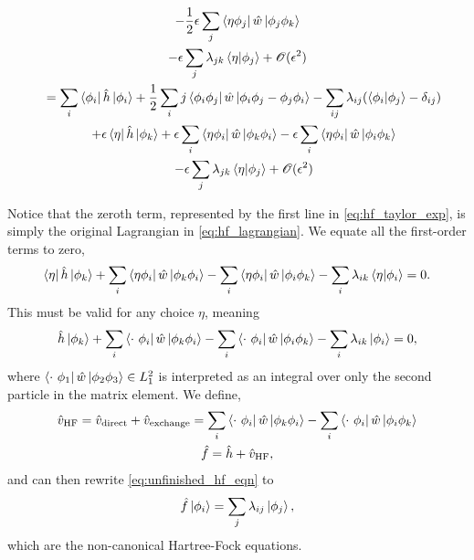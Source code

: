 \begin{gather}
\begin{gathered}
            - \frac{1}{2} \epsilon \sum_j \bra{\eta\phi_j} \hat{w}
                \ket{\phi_j \phi_k} \\
            - \epsilon \sum_j \lambda_{jk}\braket{\eta}{\phi_j}
            + \mathscr{O}(\epsilon^2) 
        \end{gathered} \\
        \quad
        \begin{gathered}
            \label{eq:hf_taylor_exp}
            =
            \sum_i \bra{\phi_i} \hat{h} \ket{\phi_i} 
            + \frac{1}{2} \sum_ij \bra{\phi_i \phi_j} \hat{w} 
                    \ket{\phi_i \phi_j - \phi_j \phi_i}
            - \sum_{ij}\lambda_{ij}(\braket{\phi_i}{\phi_j} - \delta_{ij}) \\
            + \epsilon\bra{\eta} \hat{h} \ket{\phi_k}
            + \epsilon \sum_i \bra{\eta\phi_i} \hat{w} \ket{\phi_k \phi_i}
            - \epsilon \sum_i \bra{\eta\phi_i} \hat{w} \ket{\phi_i \phi_k} \\
            - \epsilon \sum_j \lambda_{jk}\braket{\eta}{\phi_j}
            + \mathscr{O}(\epsilon^2) 
        \end{gathered}
    \end{gather}

Notice that the zeroth term, represented by the first line in \autoref{eq:hf_taylor_exp},
is simply the original Lagrangian in \autoref{eq:hf_lagrangian}. We equate all the 
first-order terms to zero,
\begin{equation}
    \bra{\eta} \hat{h} \ket{\phi_k} 
    + \sum_i \bra{\eta \phi_i} \hat{w} \ket{\phi_k\phi_i}
    - \sum_i \bra{\eta \phi_i} \hat{w} \ket{\phi_i\phi_k}
    - \sum_i \lambda_{ik} \braket{\eta}{\phi_i} = 0.
\end{equation}
This must be valid for any choice $\eta$, meaning
\begin{equation}
    \label{eq:unfinished_hf_eqn}
    \hat{h} \ket{\phi_k} 
    + \sum_i \bra{\cdot\ \phi_i} \hat{w} \ket{\phi_k\phi_i}
    - \sum_i \bra{\cdot\ \phi_i} \hat{w} \ket{\phi_i\phi_k}
    - \sum_i \lambda_{ik} \ket{\phi_i} = 0,
\end{equation}
where $\bra{\cdot\ \phi_1} \hat{w} \ket{\phi_2 \phi_3} \in L_1^2$ is interpreted
as an integral over only the second particle in the matrix element. We define,
\begin{gather}
    \hat{v}_{\text{HF}} = \hat{v}_{\text{direct}} + \hat{v}_{\text{exchange}}
        =\sum_i \bra{\cdot\ \phi_i} \hat{w} \ket{\phi_k\phi_i}
        -\sum_i \bra{\cdot\ \phi_i} \hat{w} \ket{\phi_i\phi_k} \\
    \hat{f} = \hat{h} + \hat{v}_{\text{HF}},
\end{gather}
and can then rewrite \autoref{eq:unfinished_hf_eqn} to 
\begin{equation}
    \label{eq:noncanonical_hf_eqns}
    \hat{f}\ket{\phi_i} = \sum_j \lambda_{ij}\ket{\phi_j},
\end{equation} 
which are the non-canonical Hartree-Fock equations.

